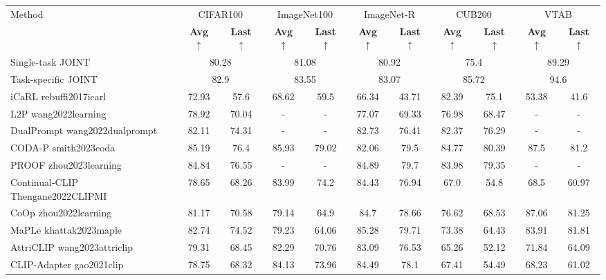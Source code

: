 \documentclass[varwidth=598pt]{standalone}
\begin{document}
\begin{table}
\centering
\begin{adjustbox}{max width=\textwidth}
\begin{tabular}{lcccccccccc}
\hline
\multirow{2}{*}{Method}  & \multicolumn{2}{c}{CIFAR100} & \multicolumn{2}{c}{ImageNet100} & \multicolumn{2}{c}{ImageNet-R} & \multicolumn{2}{c}{CUB200} & \multicolumn{2}{c}{VTAB}\\ 
&  \textbf{Avg} $\uparrow$ & \textbf{Last} $\uparrow$ & \textbf{Avg} $\uparrow$ & \textbf{Last} $\uparrow$ & \textbf{Avg} $\uparrow$ & \textbf{Last} $\uparrow$  & \textbf{Avg} $\uparrow$ & \textbf{Last} $\uparrow$ & \textbf{Avg} $\uparrow$ & \textbf{Last} $\uparrow$ \\
\midrule
Single-task JOINT  & \multicolumn{2}{c}{80.28} & \multicolumn{2}{c}{81.08} & \multicolumn{2}{c}{80.92}  &  \multicolumn{2}{c}{75.4} &  \multicolumn{2}{c}{89.29} \\
Task-specific JOINT & \multicolumn{2}{c}{82.9} & \multicolumn{2}{c}{83.55} & \multicolumn{2}{c}{83.07}  &  \multicolumn{2}{c}{85.72} &  \multicolumn{2}{c}{94.6} \\
\midrule
iCaRL rebuffi2017icarl & 72.93  & 57.6 & 68.62& 59.5 & 66.34 & 43.71  & 82.39& 75.1 & 53.38 & 41.6  \\
\midrule
L2P wang2022learning   & 78.92& 70.04 & - & - & 77.07 & 69.33  & 76.98 & 68.47&  - & -\\
DualPrompt wang2022dualprompt  & 82.11 & 74.31 & - & - & 82.73 & 76.41  &  82.37& 76.29& - & - \\
CODA-P smith2023coda & 85.19 & 76.4 & 85.93 & 79.02 & 82.06 & 79.5 & 84.77 & 80.39 & 87.5 & 81.2 \\
PROOF zhou2023learning  & 84.84 & 76.55 & - & - & 84.89 & 79.7  &  83.98& 79.35& - & -\\
\midrule
Continual-CLIP Thengane2022CLIPMI &  78.65 & 68.26 & 83.99 & 74.2 & 84.43 & 76.94  & 67.0 & 54.8 & 68.5& 60.97   \\
CoOp zhou2022learning & 81.17 & 70.58 & 79.14 & 64.9 & 84.7 & 78.66  & 76.62 & 68.53&  87.06 & 81.25 \\
MaPLe khattak2023maple & 82.74 & 74.52 & 79.23 & 64.06& 85.28 & 79.71 & 73.38 & 64.43 & 83.91 & 81.81 \\
AttriCLIP wang2023attriclip & 79.31 & 68.45 & 82.29 & 70.76 & 83.09 & 76.53  & 65.26  & 52.12 & 71.84 & 64.09 \\
CLIP-Adapter gao2021clip  & 78.75 & 68.32 & 84.13 & 73.96 & 84.49 & 78.1 & 67.41 & 54.49 & 68.23  & 61.02 \\

\end{tabular}
\end{adjustbox}
\end{table}
\end{document}
